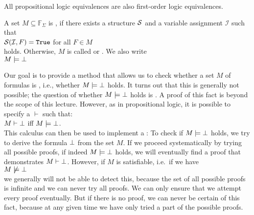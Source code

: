 \remarkEng
All propositional logic equivalences are also first-order logic equivalences.
\eox

\begin{Definition}[Satisfiable]
    A set $M \subseteq \mathbb{F}_\Sigma$ is ,
    if there exists a structure $\mathcal{S}$ and a variable assignment $\mathcal{I}$ such that 
    \\[0.2cm]
    \hspace*{1.3cm}
    $\mathcal{S}(\mathcal{I},F) = \mathtt{True}$ \quad for all $F \in M$ 
    \\[0.2cm]
    holds. Otherwise, $M$ is called  or .
    We also write \\[0.2cm]
    \hspace*{1.3cm} $M \models \bot$ 
    \eox
\end{Definition}

\noindent
Our goal is to provide a method that allows us to check
whether a set $M$ of formulas is , i.e., whether 
$M \models \bot$ holds. It turns out that this is generally not
possible; the question of whether $M \models \bot$ holds is . A proof
of this fact is beyond the scope of this lecture.
However, as in propositional logic, it is possible
to specify a  $\vdash$ such that: \\[0.2cm]
\hspace*{1.3cm} $M \vdash \bot$ \quad iff \quad $M \models \bot$. \\[0.2cm]
This calculus can then be used to implement a
: To check if
$M \models \bot$ holds, we try to derive the formula $\bot$
from the set $M$.
If we proceed systematically by trying all possible proofs,
if indeed $M \models \bot$ holds, we will eventually find a proof
that demonstrates $M \vdash \bot$. However, if $M$ is satisfiable, i.e.~if we have  \\[0.2cm]
\hspace*{1.3cm}  $M \not\models \bot$ \\[0.2cm]
we generally will not be able to detect this, because the set of all possible proofs is infinite
and we can never try all proofs. We can only ensure that
we attempt every proof eventually. But if there is no proof, we can
never be certain of this fact, because at any given time we have only tried a part of the
possible proofs.

